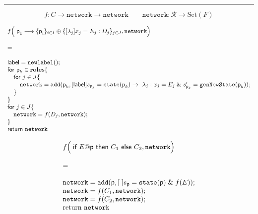 \hrule


\begin{displaymath}
	f : C \longrightarrow \texttt{network} \longrightarrow \texttt{network} \quad\quad \texttt{network} : \mathcal R \longrightarrow \text{Set}(F)
\end{displaymath}

\begin{displaymath}
  \begin{array}{ll}
    f\Big(\; \textsf{p}_1\longrightarrow\{\textsf{p}_i\}_{i\in I} \oplus \{[\lambda_j] x_j=E_j: D_j\}_{j\in J}, \texttt{network}
    \Big)
    \\\\
    =
    \\\\
    \textsf{label} = \texttt{newlabel}();\\
    \textsf{for } \textsf{p}_k \in \mathbf{roles} \{\\
    \quad\textsf{for } j \in J \{\\
    \quad\quad \texttt{network} = \texttt{add}(\textsf{p}_k,[\textsf{label}] {s_{\textsf{p}_k} = \texttt{state}(\textsf{p}_k)} \rightarrow\ \lambda_j : x_j=E_j\;\& \;s_{\textsf{p}_k}'=\texttt{genNewState}(\textsf{p}_k));\\
  	\quad\}\\
  	\}\\
	\textsf{for } j \in J \{\\
	\quad \texttt{network} = f(D_j, \texttt{network});  \\ 
	\}\\
  	\textsf{return } \texttt{network}
  \end{array}
\end{displaymath}

\begin{displaymath}
  \begin{array}{ll}
    f\Big(\; \textsf{if } E@\textsf{p} \textsf{ then } C_1 \textsf{ else } C_2, \texttt{network} 
    \Big)
    \\\\
    =
    \\\\
\texttt{network} = \texttt{add}(\textsf{p},[\;] {s_{\textsf{p}} = \texttt{state}(\textsf{p})} \;\& \;f(E));\\
	\texttt{network} = f(C_1, \texttt{network}); \\
	\texttt{network} = f(C_2, \texttt{network}); \\

 	\text{return } \texttt{network}
  \end{array}
\end{displaymath}


